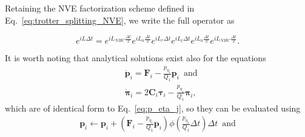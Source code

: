 \documentclass[aip,jcp,reprint,amsmath,amssymb,amsfont]{revtex4-1}
\newcommand{\mt}[1]{\boldsymbol{\mathbf{#1}}}           %
\newcommand{\vt}[1]{\boldsymbol{\mathbf{#1}}}           %
\begin{document}
Retaining the NVE factorization scheme defined in Eq.~\ref{eq:trotter_splitting_NVE}, we write the full operator as

\begin{equation}
\label{eq:trotter_splitting_NHC}
e^{i L \Delta t} =
e^{i L_{NHC} \frac{\Delta t}{2}} e^{i L_a \frac{\Delta t}{2}} e^{i L_r \Delta t} e^{i L_t \Delta t}  e^{i L_a \frac{\Delta t}{2}} e^{i L_{NHC} \frac{\Delta t}{2}}.
\end{equation}
 
It is worth noting that analytical solutions exist also for the equations
\begin{align*}
&\dot{\vt p}_i = {\vt F}_i - \frac{p_{\eta_1}}{Q_1} \vt p_i \, \text{ and} \\ 
&\dot{\vt \pi}_i = 2 \mt C_i \vt \tau_i - \frac{p_{\eta_1}}{Q_1} \vt \pi_i,
\end{align*}
which are of identical form to Eq.~\ref{eq:p_eta_j}, so they can be evaluated using
\begin{equation}
\label{eq:p}
\begin{split}
{\vt p}_i \leftarrow {\vt p}_i + \left({\vt F}_i - \frac{p_{\eta_1}}{Q_1} {\vt p}_i \right) \phi\left(\frac{p_{\eta_1}}{Q_1} \Delta t \right) \Delta t \, \text{ and}\\
\end{split}
\end{equation}
\end{document}
